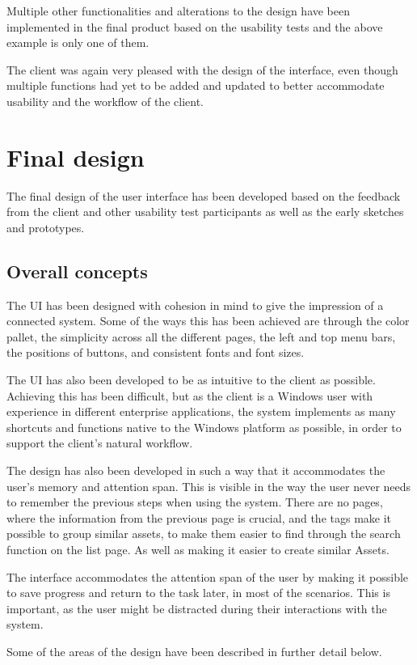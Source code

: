 Multiple other functionalities and alterations to the design have been implemented in the final product based on the usability tests and the above example is only one of them.
\par
The client was again very pleased with the design of the interface, even though multiple functions had yet to be added and updated to better accommodate usability and the workflow of the client.

\section{Final design}
The final design of the user interface has been developed based on the feedback from the client and other usability test participants as well as the early sketches and prototypes.

\subsection{Overall concepts}
The UI has been designed with cohesion in mind to give the impression of a connected system. Some of the ways this has been achieved are through the color pallet, the simplicity across all the different pages, the left and top menu bars, the positions of buttons, and consistent fonts and font sizes.
\par
The UI has also been developed to be as intuitive to the client as possible. Achieving this has been difficult, but as the client is a Windows user with experience in different enterprise applications, the system implements as many shortcuts and functions native to the Windows platform as possible, in order to support the client's natural workflow.
\par
The design has also been developed in such a way that it accommodates the user's memory and attention span. This is visible in the way the user never needs to remember the previous steps when using the system. There are no pages, where the information from the previous page is crucial, and the tags make it possible to group similar assets, to make them easier to find through the search function on the list page. As well as making it easier to create similar Assets.
\par
The interface accommodates the attention span of the user by making it possible to save progress and return to the task later, in most of the scenarios. This is important, as the user might be distracted during their interactions with the system.
\par
Some of the areas of the design have been described in further detail below.


